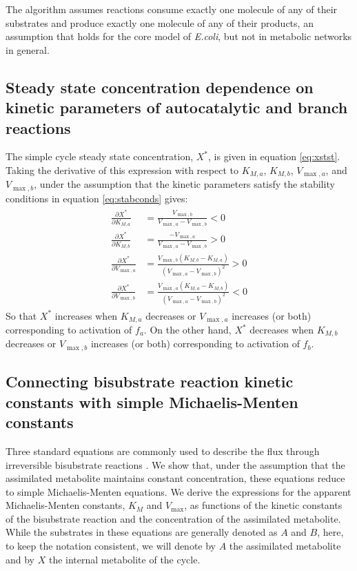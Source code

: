   The algorithm assumes reactions consume exactly one molecule of any of their substrates and produce exactly one molecule of any of their products, an assumption that holds for the core model of \emph{E.coli}, but not in metabolic networks in general.

  \label{sec:algorithm}
  \subsection{Steady state concentration dependence on kinetic parameters of autocatalytic and branch reactions}
  The simple cycle steady state concentration, $X^*$, is given in equation \ref{eq:xstst}.
  Taking the derivative of this expression with respect to $K_{M,a}$, $K_{M,b}$, $V_{\max,a}$, and $V_{\max,b}$, under the assumption that the kinetic parameters satisfy the stability conditions in equation \ref{eq:stabconds} gives:
  \begin{align}
      \begin{split}
          \label{eq:ststdep}
    \frac{\partial X^*}{\partial K_{M,a}}&=\frac{V_{\max,b}}{V_{\max,a}-V_{\max,b}}<0 \\
    \frac{\partial X^*}{\partial K_{M,b}}&=\frac{-V_{\max,a}}{V_{\max,a}-V_{\max,b}}>0 \\
    \frac{\partial X^*}{\partial V_{\max,a}}&=\frac{V_{\max,b}(K_{M,b}-K_{M,a})}{(V_{\max,a}-V_{\max,b})^2}>0 \\
    \frac{\partial X^*}{\partial V_{\max,b}}&=\frac{V_{\max,a}(K_{M,a}-K_{M,b})}{(V_{\max,a}-V_{\max,b})^2}<0
      \end{split}
  \end{align}
  So that $X^*$ increases when $K_{M,a}$ decreases or $V_{\max,a}$ increases (or both) corresponding to activation of $f_a$.
  On the other hand, $X^*$ decreases when $K_{M,b}$ decreases or $V_{\max,b}$ increases (or both) corresponding to activation of $f_b$.

  \label{sec:ststdepparams}
  \subsection{Connecting bisubstrate reaction kinetic constants with simple Michaelis-Menten constants}
  Three standard equations are commonly used to describe the flux through irreversible bisubstrate reactions \cite{Leskovac2003-li}.
  We show that, under the assumption that the assimilated metabolite maintains constant concentration, these equations reduce to simple Michaelis-Menten equations.
  We derive the expressions for the apparent Michaelis-Menten constants, $K_M$ and $V_{\max}$, as functions of the kinetic constants of the bisubstrate reaction and the concentration of the assimilated metabolite.
  While the substrates in these equations are generally denoted as $A$ and $B$, here, to keep the notation consistent, we will denote by $A$ the assimilated metabolite and by $X$ the internal metabolite of the cycle.

